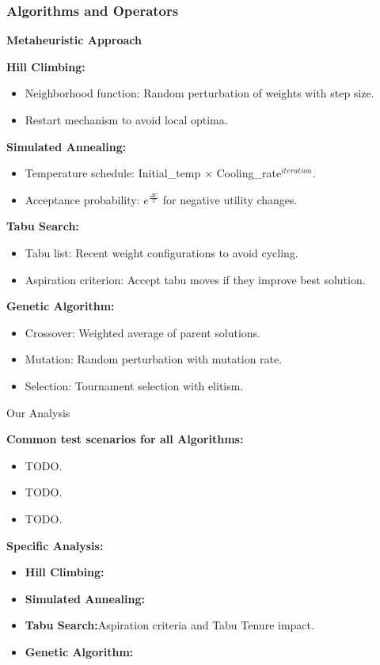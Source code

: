 \documentclass{beamer}
\begin{document}
\begin{frame}
    \frametitle{Algorithms and Operators}
    \textbf{Metaheuristic Approach}

    \textbf{Hill Climbing:}
    \begin{itemize}
        \item Neighborhood function: Random perturbation of weights with step size.
        \item Restart mechanism to avoid local optima.
    \end{itemize}

    \textbf{Simulated Annealing:}
    \begin{itemize}
        \item Temperature schedule: Initial\_temp $\times$ Cooling\_rate$^{iteration}$.
        \item Acceptance probability: $e^{\frac{\Delta U}{T}}$ for negative utility changes.
    \end{itemize}

    \textbf{Tabu Search:}
    \begin{itemize}
        \item Tabu list: Recent weight configurations to avoid cycling.
        \item Aspiration criterion: Accept tabu moves if they improve best solution.
    \end{itemize}

    \textbf{Genetic Algorithm:}
    \begin{itemize}
        \item Crossover: Weighted average of parent solutions.
        \item Mutation: Random perturbation with mutation rate.
        \item Selection: Tournament selection with elitism.
    \end{itemize}
\end{frame}

\begin{frame}{Our Analysis}

    
    \textbf{Common test scenarios for all Algorithms:}
    \begin{itemize}
        \item TODO.
        \item TODO.
        \item TODO.
    \end{itemize}
    \vspace{4 pt}
    \textbf{Specific Analysis:}
    \begin{itemize}
        \item \textbf{Hill Climbing:}
        \item \textbf{Simulated Annealing:}
        \item \textbf{Tabu Search:}Aspiration criteria and Tabu
        Tenure impact.
        \item \textbf{Genetic Algorithm:}

    \end{itemize}
    

\end{frame}
\end{document}
